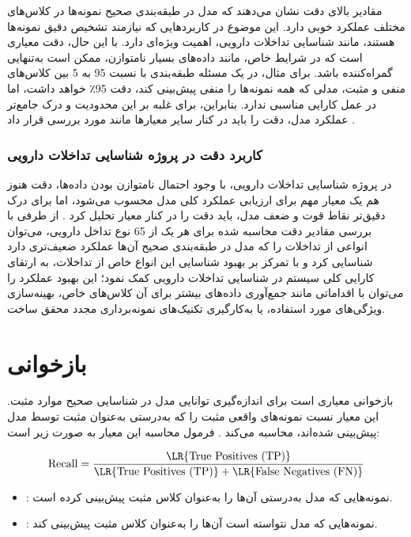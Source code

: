 مقادیر بالای دقت نشان می‌دهند که مدل در طبقه‌بندی صحیح نمونه‌ها در کلاس‌های مختلف عملکرد خوبی دارد. این موضوع در کاربردهایی که نیازمند تشخیص دقیق نمونه‌ها هستند، مانند شناسایی تداخلات دارویی، اهمیت ویژه‌ای دارد. با این حال، دقت معیاری است که در شرایط خاص، مانند داده‌های بسیار نامتوازن، ممکن است به‌تنهایی گمراه‌کننده باشد. برای مثال، در یک مسئله طبقه‌بندی با نسبت 95 به 5 بین کلاس‌های منفی و مثبت، مدلی که همه نمونه‌ها را منفی پیش‌بینی کند، دقت 95٪ خواهد داشت، اما در عمل کارایی مناسبی ندارد. بنابراین، برای غلبه بر این محدودیت و درک جامع‌تر عملکرد مدل، دقت را باید در کنار سایر معیارها مانند  مورد بررسی قرار داد \cite{ref_sokolova2009, ref_powers2011}.

\subsubsection{کاربرد دقت در پروژه شناسایی تداخلات دارویی}
در پروژه شناسایی تداخلات دارویی، با وجود احتمال نامتوازن بودن داده‌ها، دقت هنوز هم یک معیار مهم برای ارزیابی عملکرد کلی مدل محسوب می‌شود، اما برای درک دقیق‌تر نقاط قوت و ضعف مدل، باید دقت را در کنار معیار  تحلیل کرد \cite{ref_sokolova2009}. از طرفی با بررسی مقادیر دقت محاسبه شده برای هر یک از 65 نوع تداخل دارویی، می‌توان انواعی از تداخلات را که مدل در طبقه‌بندی صحیح آن‌ها عملکرد ضعیف‌تری دارد شناسایی کرد و با تمرکز بر بهبود شناسایی این انواع خاص از تداخلات، به ارتقای کارایی کلی سیستم در شناسایی تداخلات دارویی کمک نمود؛ این بهبود عملکرد را می‌توان با اقداماتی مانند جمع‌آوری داده‌های بیشتر برای آن کلاس‌های خاص، بهینه‌سازی ویژگی‌های مورد استفاده، یا به‌کارگیری تکنیک‌های نمونه‌برداری مجدد محقق ساخت.

\section{بازخوانی}

بازخوانی معیاری است برای اندازه‌گیری توانایی مدل در شناسایی صحیح موارد مثبت. این معیار نسبت نمونه‌های واقعی مثبت را که به‌درستی به‌عنوان مثبت توسط مدل پیش‌بینی شده‌اند، محاسبه می‌کند \cite{ref_powers2011}. فرمول محاسبه این معیار به صورت زیر است:

\begin{equation}
	\text{Recall} = \frac{\text{\LR{True Positives (TP)}}}{\text{\LR{True Positives (TP)}} + \text{\LR{False Negatives (FN)}}}
\end{equation}

\begin{itemize}
	\item \textbf{}: نمونه‌هایی که مدل به‌درستی آن‌ها را به‌عنوان کلاس مثبت پیش‌بینی کرده است.
	\item \textbf{}: نمونه‌هایی که مدل نتواسته است آن‌ها را به‌عنوان کلاس مثبت پیش‌بینی کند.
\end{itemize}

